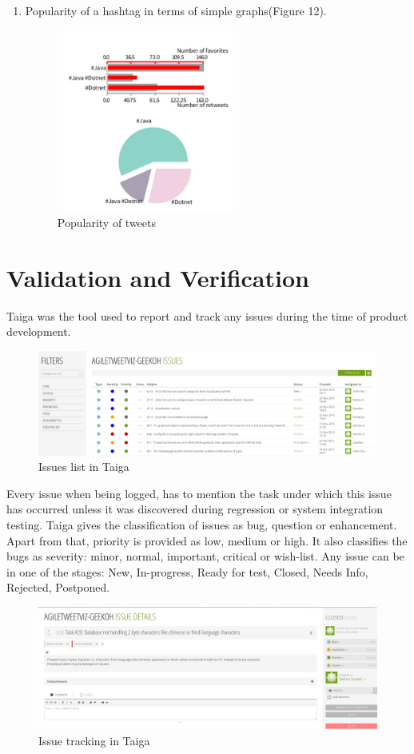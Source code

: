 \documentclass[11pt]{article}
\begin{document}
\begin{enumerate}
\item Popularity of a hashtag in terms of simple graphs(Figure 12).
\begin{figure}[h]
\centering
\includegraphics[width=6cm, height=6cm]{Graph.jpg}
\caption{Popularity of tweets}
\end{figure}


\end{enumerate}

\section{Validation and Verification}
Taiga was the tool used to report and track any issues during the time of product development.

\begin{figure}[h]
\centering
\includegraphics[width=\textwidth]{Issues.jpg}
\caption{Issues list in Taiga}
\end{figure}

Every issue when being logged, has to mention the task under which this issue has occurred unless it was discovered during regression or system integration testing. Taiga gives the classification of issues as bug, question or enhancement. Apart from that, priority is provided as low, medium or high. It also classifies the bugs as severity:  minor, normal, important, critical or wish-list. Any issue can be in one of the stages: New, In-progress, Ready for test, Closed, Needs Info, Rejected, Postponed. 

\begin{figure}[h]
\centering
\includegraphics[width=\textwidth]{Issue2.jpg}
\caption{Issue tracking in Taiga}
\end{figure}
\end{document}
